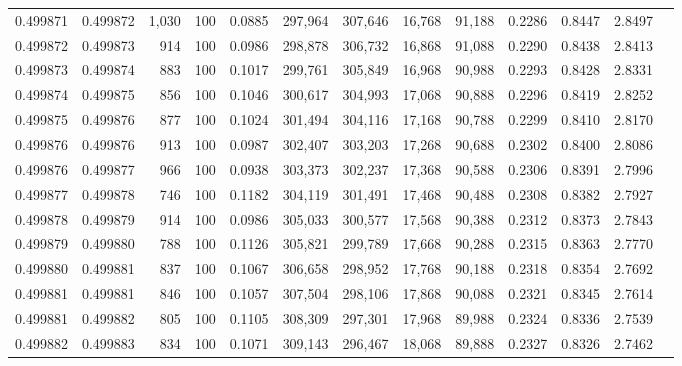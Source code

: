 \begin{tabular}{rrrrrrrrrrrrr}
0.499871 & 0.499872 & 1,030 & 100 &                                     0.0885 & 297,964 & 307,646 &  16,768 &  91,188 & 0.2286 & 0.8447 & 2.8497 \\
0.499872 & 0.499873 &   914 & 100 &                                     0.0986 & 298,878 & 306,732 &  16,868 &  91,088 & 0.2290 & 0.8438 & 2.8413 \\
0.499873 & 0.499874 &   883 & 100 &                                     0.1017 & 299,761 & 305,849 &  16,968 &  90,988 & 0.2293 & 0.8428 & 2.8331 \\
0.499874 & 0.499875 &   856 & 100 &                                     0.1046 & 300,617 & 304,993 &  17,068 &  90,888 & 0.2296 & 0.8419 & 2.8252 \\
0.499875 & 0.499876 &   877 & 100 &                                     0.1024 & 301,494 & 304,116 &  17,168 &  90,788 & 0.2299 & 0.8410 & 2.8170 \\
0.499876 & 0.499876 &   913 & 100 &                                     0.0987 & 302,407 & 303,203 &  17,268 &  90,688 & 0.2302 & 0.8400 & 2.8086 \\
0.499876 & 0.499877 &   966 & 100 &                                     0.0938 & 303,373 & 302,237 &  17,368 &  90,588 & 0.2306 & 0.8391 & 2.7996 \\
0.499877 & 0.499878 &   746 & 100 &                                     0.1182 & 304,119 & 301,491 &  17,468 &  90,488 & 0.2308 & 0.8382 & 2.7927 \\
0.499878 & 0.499879 &   914 & 100 &                                     0.0986 & 305,033 & 300,577 &  17,568 &  90,388 & 0.2312 & 0.8373 & 2.7843 \\
0.499879 & 0.499880 &   788 & 100 &                                     0.1126 & 305,821 & 299,789 &  17,668 &  90,288 & 0.2315 & 0.8363 & 2.7770 \\
0.499880 & 0.499881 &   837 & 100 &                                     0.1067 & 306,658 & 298,952 &  17,768 &  90,188 & 0.2318 & 0.8354 & 2.7692 \\
0.499881 & 0.499881 &   846 & 100 &                                     0.1057 & 307,504 & 298,106 &  17,868 &  90,088 & 0.2321 & 0.8345 & 2.7614 \\
0.499881 & 0.499882 &   805 & 100 &                                     0.1105 & 308,309 & 297,301 &  17,968 &  89,988 & 0.2324 & 0.8336 & 2.7539 \\
0.499882 & 0.499883 &   834 & 100 &                                     0.1071 & 309,143 & 296,467 &  18,068 &  89,888 & 0.2327 & 0.8326 & 2.7462 \\

\end{tabular}
